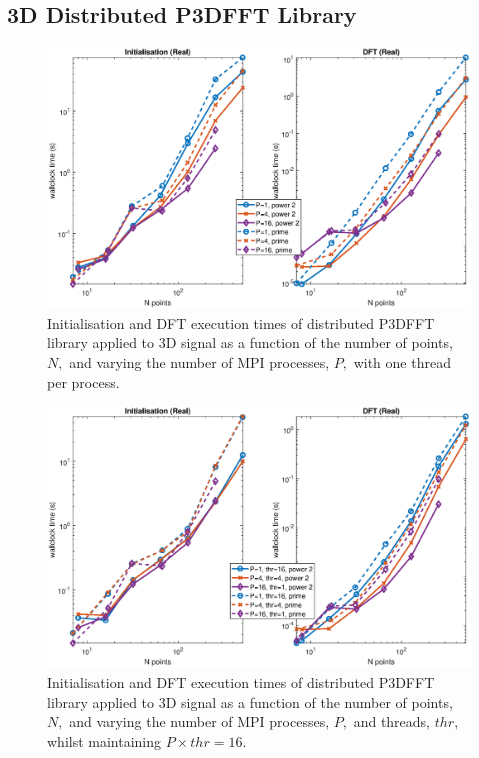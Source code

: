 \documentclass[a4paper]{article}
\begin{document}
\subsection{3D Distributed P3DFFT Library}\label{Sec:3DDistP3DFFT}

\begin{figure}[htb]
    \centering
    \includegraphics[width=\linewidth]{../results/p3dfft_3d_mpi.eps}
  \caption{Initialisation and DFT execution times of distributed P3DFFT library applied to 3D signal as a function of the
    number of points, $N,$ and varying the number of MPI processes, $P,$ with one thread per process.}
  \label{3DDistP3DFFT}
\end{figure}

\begin{figure}[htb]
    \centering
    \includegraphics[width=\linewidth]{../results/p3dfft_3d_mpi_thr.eps}
  \caption{Initialisation and DFT execution times of distributed P3DFFT library applied to 3D signal as a function of the
    number of points, $N,$ and varying the number of MPI processes, $P,$ and threads, $thr,$ whilst maintaining $P\times thr=16.$}
  \label{3DDistP3DFFT16}
\end{figure}
\end{document}
